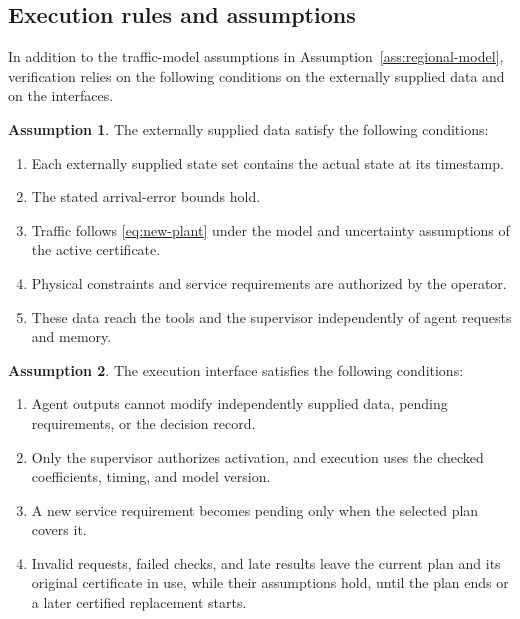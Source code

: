 \documentclass[final]{cas-sc}
\theoremstyle{definition}
\newtheorem{assumption}{Assumption}
\theoremstyle{plain}
\theoremstyle{definition}
\theoremstyle{plain}
\begin{document}
\subsection{Execution rules and assumptions}
\label{sec:execution-interface}

In addition to the traffic-model assumptions in
Assumption~\ref{ass:regional-model}, verification relies on the
following conditions on the externally supplied data and on the
interfaces.

\begin{assumption}
\label{ass:trusted-inputs}
The externally supplied data satisfy the following conditions:
\begin{enumerate}
\renewcommand{\labelenumi}{(\alph{enumi})}
\item Each externally supplied state set contains the actual state at
its timestamp.
\item The stated arrival-error bounds hold.
\item Traffic follows \eqref{eq:new-plant} under the
model and uncertainty assumptions of the active certificate.
\item Physical constraints and service requirements are authorized by
the operator.
\item These data reach the tools and the supervisor independently of
agent requests and memory.
\end{enumerate}
\end{assumption}

\begin{assumption}
\label{ass:supervisory-separation}
The execution interface satisfies the following conditions:
\begin{enumerate}
\renewcommand{\labelenumi}{(\alph{enumi})}
\item Agent outputs cannot modify independently supplied data, pending
requirements, or the decision record.
\item Only the supervisor authorizes activation, and execution uses
the checked coefficients, timing, and model version.
\item A new service requirement becomes pending only when the selected
plan covers it.
\item Invalid requests, failed checks, and late results leave the
current plan and its original certificate in use, while their
assumptions hold, until the plan ends or a later certified replacement
starts.
\end{enumerate}
\end{assumption}
\end{document}
